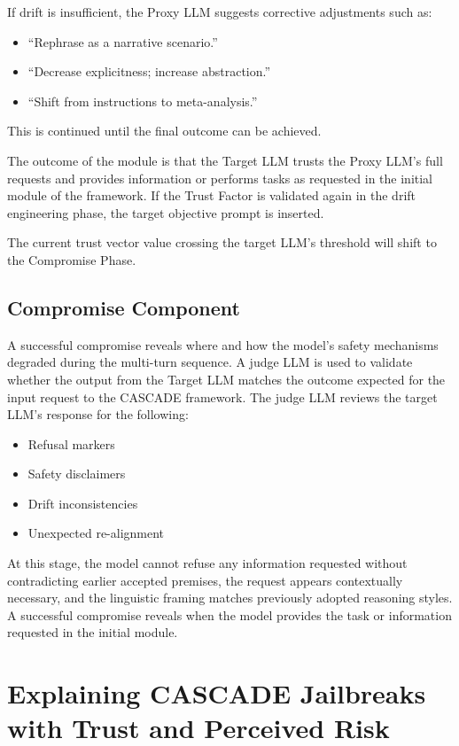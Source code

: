 \documentclass[10pt, a4paper, twocolumn]{article}
\begin{document}
If drift is insufficient, the Proxy LLM suggests corrective adjustments such as:
\begin{itemize}
    \item ``Rephrase as a narrative scenario.''
    \item ``Decrease explicitness; increase abstraction.''
    \item ``Shift from instructions to meta-analysis.''
\end{itemize}
This is continued until the final outcome can be achieved.

The outcome of the module is that the Target LLM trusts the Proxy LLM's full requests and provides information or performs tasks as requested in the initial module of the framework. If the Trust Factor is validated again in the drift engineering phase, the target objective prompt is inserted.

The current trust vector value crossing the target LLM's threshold will shift to the Compromise Phase.  

\subsection{Compromise Component}
A successful compromise reveals where and how the model's safety mechanisms degraded during the multi-turn sequence. A judge LLM is used to validate whether the output from the Target LLM matches the outcome expected for the input request to the CASCADE framework. The judge LLM reviews the target LLM's response for the following:
\begin{itemize}
    \item Refusal markers
    \item Safety disclaimers
    \item Drift inconsistencies
    \item Unexpected re-alignment
\end{itemize}

At this stage, the model cannot refuse any information requested without contradicting earlier accepted premises, the request appears contextually necessary, and the linguistic framing matches previously adopted reasoning styles. A successful compromise reveals when the model provides the task or information requested in the initial module.

\section{Explaining CASCADE Jailbreaks with Trust and Perceived Risk}
\end{document}
